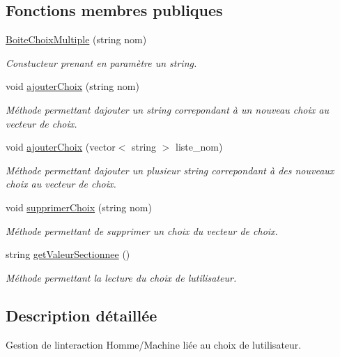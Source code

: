 \subsection*{Fonctions membres publiques}
\begin{DoxyCompactItemize}
\item 
\hyperlink{classBoiteChoixMultiple_a33c5d1f1b62448952ea8503cdb7ade50}{Boite\+Choix\+Multiple} (string nom)
\begin{DoxyCompactList}\small\item\em Constucteur prenant en paramètre un string. \end{DoxyCompactList}\item 
void \hyperlink{classBoiteChoixMultiple_aa0acac137fd87665bc4225e1eec6e387}{ajouter\+Choix} (string nom)
\begin{DoxyCompactList}\small\item\em Méthode permettant d\textquotesingle{}ajouter un string correpondant à un nouveau choix au vecteur de choix. \end{DoxyCompactList}\item 
void \hyperlink{classBoiteChoixMultiple_a52c59e771b17233ba4e1816907a68284}{ajouter\+Choix} (vector$<$ string $>$ liste\+\_\+nom)
\begin{DoxyCompactList}\small\item\em Méthode permettant d\textquotesingle{}ajouter un plusieur string correpondant à des nouveaux choix au vecteur de choix. \end{DoxyCompactList}\item 
void \hyperlink{classBoiteChoixMultiple_ab37e456d084fb9e70d7e24df0839916f}{supprimer\+Choix} (string nom)
\begin{DoxyCompactList}\small\item\em Méthode permettant de supprimer un choix du vecteur de choix. \end{DoxyCompactList}\item 
string \hyperlink{classBoiteChoixMultiple_a3766802fe49f850dbda7a6bdbcb2d5d7}{get\+Valeur\+Sectionnee} ()
\begin{DoxyCompactList}\small\item\em Méthode permettant la lecture du choix de l\textquotesingle{}utilisateur. \end{DoxyCompactList}\end{DoxyCompactItemize}


\subsection{Description détaillée}
Gestion de l\textquotesingle{}interaction Homme/\+Machine liée au choix de l\textquotesingle{}utilisateur. 

